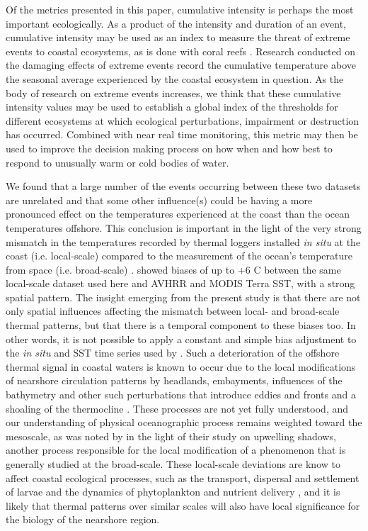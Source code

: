 \documentclass[a4paper,10pt,review]{elsarticle}
\begin{document}
Of the metrics presented in this paper, cumulative intensity is perhaps the most important ecologically. As a product of the intensity and duration of an event, cumulative intensity may be used as an index to measure the threat of extreme events to coastal ecosystems, as is done with coral reefs \citep[e.g.][]{Selig2010}. Research conducted on the damaging effects of extreme events \citep[e.g.][]{Wernberg2013} record the cumulative temperature above the seasonal average experienced by the coastal ecosystem in question. As the body of research on extreme events increases, we think that these cumulative intensity values may be used to establish a global index of the thresholds for different ecosystems at which ecological perturbations, impairment or destruction has occurred. Combined with near real time monitoring, this metric may then be used to improve the decision making process on how when and how best to respond to unusually warm or cold bodies of water.

We found that a large number of the events occurring between these two datasets are unrelated and that some other influence(s) could be having a more pronounced effect on the temperatures experienced at the coast than the ocean temperatures offshore. This conclusion is important in the light of the very strong mismatch in the temperatures recorded by thermal loggers installed \emph{in situ} at the coast (i.e. local-scale) compared to the measurement of the ocean's temperature from space (i.e. broad-scale) \citep{Smit2013}. \citet{Smit2013} showed biases of up to +6 \degree C between the same local-scale dataset used here and AVHRR and MODIS Terra SST, with a strong spatial pattern. The insight emerging from the present study is that there are not only spatial influences affecting the mismatch between local- and broad-scale thermal patterns, but that there is a temporal component to these biases too. In other words, it is not possible to apply a constant and simple bias adjustment to the \emph{in situ} and SST time series used by \citet{Smit2013}. Such a deterioration of the offshore thermal signal in coastal waters is known to occur due to the local modifications of nearshore circulation patterns by headlands, embayments, influences of the bathymetry and other such perturbations that introduce eddies and fronts and a shoaling of the thermocline \citep{Okubo1973, Pingree1979, Wolanski1988, Black1990, Grundlingh1991, Graham1997}. These processes are not yet fully understood, and our understanding of physical oceanographic process remains weighted toward the mesoscale, as was noted by \citet{Graham1997} in the light of their study on upwelling shadows, another process responsible for the local modification of a phenomenon that is generally studied at the broad-scale. These local-scale deviations are know to affect coastal ecological processes, such as the transport, dispersal and settlement of larvae \citep{Pineda1994, McCulloch2003, Narvaez2004} and the dynamics of phytoplankton and nutrient delivery \citep{Graham1997, Pineda1994}, and it is likely that thermal patterns over similar scales will also have local significance for the biology of the nearshore region.
\end{document}
